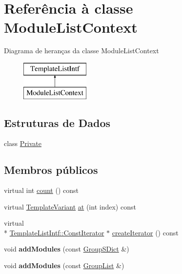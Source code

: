 \hypertarget{class_module_list_context}{\section{Referência à classe Module\-List\-Context}
\label{class_module_list_context}
}
Diagrama de heranças da classe Module\-List\-Context\begin{figure}[H]
\begin{center}
\leavevmode
\includegraphics[height=2.000000cm]{class_module_list_context}
\end{center}
\end{figure}
\subsection*{Estruturas de Dados}
\begin{DoxyCompactItemize}
\item 
class \hyperlink{class_module_list_context_1_1_private}{Private}
\end{DoxyCompactItemize}
\subsection*{Membros públicos}
\begin{DoxyCompactItemize}
\item 
virtual int \hyperlink{class_module_list_context_a0745638c9967e2ed90bc96c012288c55}{count} () const 
\item 
virtual \hyperlink{class_template_variant}{Template\-Variant} \hyperlink{class_module_list_context_a55f90d50fcb1378b2a97b9c3ad5bb162}{at} (int index) const 
\item 
virtual \\*
\hyperlink{class_template_list_intf_1_1_const_iterator}{Template\-List\-Intf\-::\-Const\-Iterator} $\ast$ \hyperlink{class_module_list_context_a0b1d6dedc3f51750e5cba18f51022f10}{create\-Iterator} () const 
\item 
\hypertarget{class_module_list_context_aadf702ac770522dd95ca2f4937f3ce82}{void {\bfseries add\-Modules} (const \hyperlink{class_group_s_dict}{Group\-S\-Dict} \&)}\label{class_module_list_context_aadf702ac770522dd95ca2f4937f3ce82}

\item 
\hypertarget{class_module_list_context_aa96741e87f306b682fd0fc93f29a346b}{void {\bfseries add\-Modules} (const \hyperlink{class_group_list}{Group\-List} \&)}\label{class_module_list_context_aa96741e87f306b682fd0fc93f29a346b}

\end{DoxyCompactItemize}


